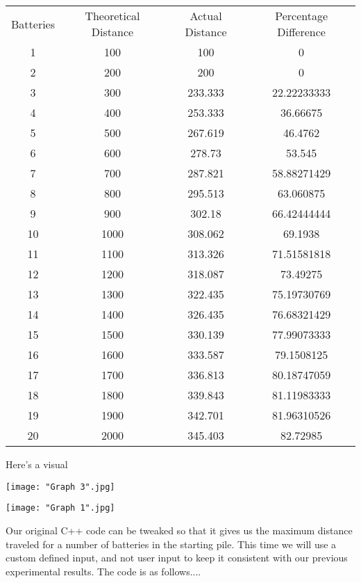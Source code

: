 \documentclass[a4paper, 12pt]{article}
\begin{document}
\begin{flushleft}
	\begin{center}
	    \begin{tabular}{|c|c|c|c|}\hline
	     Batteries&	Theoretical Distance&	Actual Distance&	Percentage Difference\\
	     1	&100	&100	&0\\
2	&200	&200	&0\\
3	&300	&233.333	&22.22233333\\
4	&400	&253.333	&36.66675\\
5	&500	&267.619	&46.4762\\
6	&600	&278.73	&53.545\\
7	&700	&287.821	&58.88271429\\
8	&800	&295.513	&63.060875\\
9	&900	&302.18	&66.42444444\\
10	&1000	&308.062	&69.1938\\
11	&1100	&313.326	&71.51581818\\
12	&1200	&318.087	&73.49275\\
13	&1300	&322.435	&75.19730769\\
14	&1400	&326.435	&76.68321429\\
15	&1500	&330.139	&77.99073333\\
16	&1600	&333.587	&79.1508125\\
17	&1700	&336.813	&80.18747059\\
18	&1800	&339.843	&81.11983333\\
19	&1900	&342.701	&81.96310526\\
20	&2000	&345.403	&82.72985\\\hline
	    \end{tabular}
	\end{center}
	Here's a visual
	\begin{center}
	    \texttt{[image: "Graph 3".jpg]}
	\end{center}
	\begin{center}
	\texttt{[image: "Graph 1".jpg]}
	\end{center}
	
	Our original C++ code can be tweaked so that it gives us the maximum distance traveled for a number of batteries in the starting pile. This time we will use a custom defined input, and not user input to keep it consistent with our previous experimental results. The code is as follows....
\end{flushleft}
\end{document}
